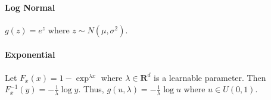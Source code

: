 

\paragraph{Log Normal}$g(z) = e^z$ where $z \sim N(\mu, \sigma^2)$.



\paragraph{Exponential} Let $F_x(x) = 1 - \exp^{\lambda x}$ where $\lambda\in \mathbf{R}^d$ is a learnable parameter. Then $F_x^{-1}(y) = -\frac{1}{\lambda} \log y$. Thus, $g(u, \lambda) = -\frac{1}{\lambda} \log u$ where $u \in U(0, 1)$.

